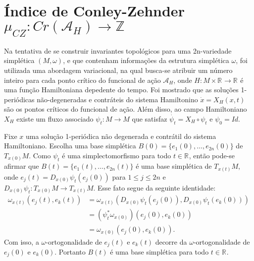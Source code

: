 \documentclass[12pt]{book}
\newcommand{\campohamiltoniano}[1]{X_{H}(#1)}
\newcommand{\campohamiltonianoabrev}{X_{H}}
\newcommand{\espacotangenteponto}[2]{T_{#1}#2}
\newcommand{\funcionalH}{\mathcal{A}_{H}}
\newcommand{\iconleyabrev}{\mu_{CZ}}
\newcommand{\inteiros}{\mathbb{Z}}
\newcommand{\pontoscriticos}[1]{\textit{Cr}(#1)}
\newcommand{\real}[1]{\mathbb{R}^{#1}}
\newcommand{\reta}{\real{}}
\begin{document}
	\section{Índice de Conley-Zehnder $\iconleyabrev: \pontoscriticos{\funcionalH}\to \inteiros$}\label{secao_indice_conley}
	
	Na tentativa de se construir invariantes topológicos para uma 2n-variedade simplética $(M, \omega)$, e que contenham informações da estrutura simplética $\omega$, foi utilizada uma abordagem variacional, na qual busca-se atribuir um número inteiro para cada ponto crítico do funcional de ação $\funcionalH$, onde $H: M\times \reta\to \reta$ é uma função Hamiltoniana depedente do tempo. Foi mostrado que as soluções 1-periódicas não-degeneradas e contráteis do sistema Hamiltonino $\dot{x} = \campohamiltoniano{x, t}$ são os pontos críticos do funcional de ação. Além disso, ao campo Hamiltoniano $\campohamiltonianoabrev$ existe um fluxo associado $\psi_{t}:M\to M$ que satisfaz $\dot{\psi_{t}} =\campohamiltonianoabrev\circ\psi_{t}$ e $\psi_{0}=Id$.
	
	Fixe $x $ uma solução 1-periódica não degenerada e contrátil do sistema Hamiltoniano. Escolha uma base simplética $B(0) = \{e_{1}(0),\dots,e_{2n}(0)\}$ de $\espacotangenteponto{x(0)}{M}$. Como $\psi_{t}$ é uma simplectomorfismo para todo $t\in \reta$, então pode-se afirmar que $B(t) = \{e_{1}(t), \dots, e_{2n}(t)\}$ é uma base simplética de $\espacotangenteponto{x(t)}{M}$, onde $e_{j}(t) = D_{x(0)}\psi_{t}(e_{j}(0))$ para $1\leq j \leq 2n$ e $D_{x(0)}\psi_{t}: \espacotangenteponto{x(0)}{M}\to \espacotangenteponto{x(t)}{M}$. Esse fato segue da seguinte identidade:
	$$
	\begin{aligned}
	\omega_{x(t)}(e_{j}(t), e_{k}(t))
	&=
	\omega_{x(t)}(D_{x(0)}\psi_{t}(e_{j}(0)), D_{x(0)}\psi_{t}(e_{k}(0)))
	\\
	&=	(\psi^{*}_{t}\omega_{x(0)})(e_{j}(0), e_{k}(0))
	\\
	&=	\omega_{x(0)}(e_{j}(0), e_{k}(0)).
	\end{aligned}
	$$
	Com isso, a $\omega$-ortogonalidade de $e_{j}(t)$ e $e_{k}(t)$ decorre da $\omega$-ortogonalidade de $e_{j}(0)$ e $e_{k}(0)$. Portanto $B(t)$ é uma base simplética para todo $t\in \reta$.
	
\end{document}
